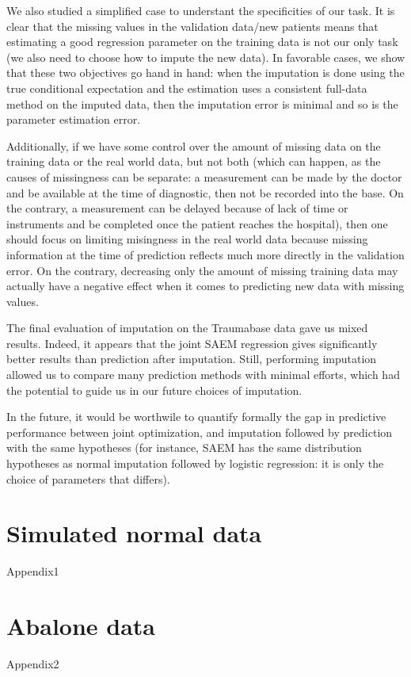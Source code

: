 \documentclass[12pt, a4paper]{memoir}
\begin{document}
We also studied a simplified case to understant the specificities of our task. It is clear that the missing values in the validation data/new patients means that estimating a good regression parameter on the training data is not our only task (we also need to choose how to impute the new data). In favorable cases, we show that these two objectives go hand in hand: when the imputation is done using the true conditional expectation and the estimation uses a consistent full-data method on the imputed data, then the imputation error is minimal and so is the parameter estimation error. 

Additionally, if we have some control over the amount of missing data on the training data or the real world data, but not both (which can happen, as the causes of missingness can be separate: a measurement can be made by the doctor and be available at the time of diagnostic, then not be recorded into the base. On the contrary, a measurement can be delayed because of lack of time or instruments and be completed once the patient reaches the hospital), then one should focus on limiting misingness in the real world data because missing information at the time of prediction reflects much more directly in the validation error. On the contrary, decreasing only the amount of missing training data may actually have a negative effect when it comes to predicting new data with missing values.

The final evaluation of imputation on the Traumabase data gave us mixed results. Indeed, it appears that the joint SAEM regression gives significantly better results than prediction after imputation. Still, performing imputation allowed us to compare many prediction methods with minimal efforts, which had the potential to guide us in our future choices of imputation.

In the future, it would be worthwile to quantify formally the gap in predictive performance between joint optimization, and imputation followed by prediction with the same hypotheses (for instance, SAEM has the same distribution hypotheses as normal imputation followed by logistic regression: it is only the choice of parameters that differs).
\begin{appendices}
\chapter{Simulated normal data}
\label{simulation}
{Appendix1}

\chapter{Abalone data}
\label{abalone}
{Appendix2}
\end{appendices}


\end{document}
